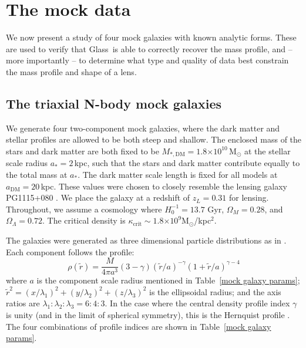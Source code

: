 \documentclass[galley,usenatbib]{mn2e}
\newcommand{\Glass}{{\sc Glass}}
\newcommand{\Msun}{\ensuremath{\mathrm{M}_\odot}}
\newcommand{\tabref}[1] {Table~\ref{#1}}
\newcommand{\e}[1]{\ensuremath{\times 10^{#1}}}
\begin{document}
\section{The mock data}\label{sec:mockdata}

We now present a study of four mock galaxies with known analytic forms. These
are used to verify that \Glass\ is able to correctly recover the mass profile,
and -- more importantly -- to determine what type and quality of data best
constrain the mass profile and shape of a lens.

\subsection{The triaxial N-body mock galaxies}

We generate four two-component mock galaxies, where the dark matter and stellar
profiles are allowed to be both steep and shallow.  The enclosed mass of the
stars and dark matter are both fixed to be $M_{*,\mathrm{DM}} =
1.8\e{10}$\,M$_\odot$ at the stellar scale radius $a_* = 2$\,kpc, such that the
stars and dark matter contribute equally to the total mass at $a_*$. The dark
matter scale length is fixed for all models at $a_\mathrm{DM} = 20$\,kpc.
These values were chosen to closely resemble the lensing galaxy PG1115+080
\citep{1980Natur.285..641W}. We place the galaxy at a redshift of $z_L = 0.31$
for lensing.  Throughout, we assume a cosmology where $H_0^{-1}=13.7$ Gyr,
$\Omega_M=0.28$, and $\Omega_\Lambda=0.72$. The critical density is
$\kappa_\mathrm{crit}\sim 1.8\e{9}$\Msun/kpc$^2$.

The galaxies were generated as three dimensional particle distributions as in
\citet{2009MNRAS.395.1079D}. Each component follows the profile:
%
\begin{equation} 
  \rho(\tilde r) = \frac{M}{4\pi a^3}(3-\gamma){(\tilde r/a)^{-\gamma}(1 + \tilde r/a)^{\gamma-4}} 
  \label{Dehnen profile} 
\end{equation} 
%
where $a$ is the component scale radius mentioned in \tabref{mock galaxy
params}; $\tilde r^2 = (x/\lambda_1)^2 + (y/\lambda_2)^2 + (z/\lambda_3)^2$ is the
ellipsoidal radius; and the axis ratios are $\lambda_1:\lambda_2:\lambda_3 =
6:4:3$.  In the case where the central density profile index $\gamma$ is unity
(and in the limit of spherical symmetry), this is the Hernquist profile
\citep{1990ApJ...356..359H}.  The four combinations of profile indices are
shown in \tabref{mock galaxy params}.
\end{document}
